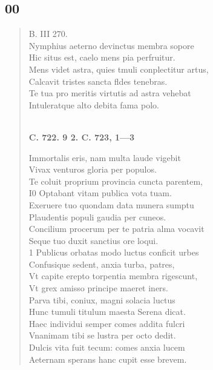 \documentclass[11pt, a4paper]{report}
\begin{document}
            \subsection*{00}
      \begin{verse}
      B. III 270. \\ Nymphius aeterno devinctus membra sopore \\ Hic situs est, caelo mens pia perfruitur. \\ Mens videt astra, quies tmuli conplectitur artus, \\ Calcavit tristes sancta fldes tenebras. \\ Te tua pro meritis virtutis ad astra vehebat \\ Intuleratque alto debita fama polo. \\ 
        ﻿\pagebreak 
    \begin{center} \textbf{C. 722. 9 2. C. 723, 1—3} \end{center} \marginpar{[207]} Immortalis eris, nam multa laude vigebit \\ Vivax venturos gloria per populos. \\ Te coluit proprium provincia cuncta parentem, \\ I0 Optabant vitam publica vota tuam. \\ Exeruere tuo quondam data munera sumptu \\ Plaudentis populi gaudia per cuneos. \\ Concilium procerum per te patria alma vocavit \\ Seque tuo duxit sanctius ore loqui. \\ 1 Publicus orbatas modo luctus conficit urbes \\ Confusique sedent, anxia turba, patres, \\ Vt capite erepto torpentia membra rigescunt, \\ Vt grex amisso principe maeret iners. \\ Parva tibi, coniux, magni solacia luctus \\ Hunc tumuli titulum maesta Serena dicat. \\ Haec individui semper comes addita fulcri \\ Vnanimam tibi se lustra per octo dedit. \\ Dulcis vita fuit tecum: comes anxia lucem \\ Aeternam sperans hanc cupit esse brevem. \\ 
      \end{verse}
  
\end{document}
